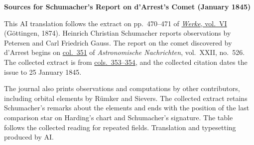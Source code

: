 \clearpage\thispagestyle{empty}
\begin{center}\textbf{Sources for Schumacher’s Report on d’Arrest’s Comet (January 1845)}\end{center}
\noindent This AI translation follows the extract on pp.~470--471 of \href{https://gdz.sub.uni-goettingen.de/id/PPN236007467}{\textit{Werke}, vol.~VI} (Göttingen, 1874). Heinrich Christian Schumacher reports observations by Petersen and Carl Friedrich Gauss. The report on the comet discovered by d’Arrest begins on \href{https://api.digitale-sammlungen.de/iiif/image/v2/bsb10049447_00184/full/1800,/0/default.jpg}{col.~351} of \textit{Astronomische Nachrichten}, vol.~XXII, no.~526. The collected extract is from \href{https://api.digitale-sammlungen.de/iiif/image/v2/bsb10049447_00185/full/1800,/0/default.jpg}{cols.~353--354}, and the collected citation dates the issue to 25 January 1845.
\par\smallskip\noindent The journal also prints observations and computations by other contributors, including orbital elements by Rümker and Sievers. The collected extract retains Schumacher’s remarks about the elements and ends with the position of the last comparison star on Harding’s chart and Schumacher’s signature. The table follows the collected reading for repeated fields. Translation and typesetting produced by AI.
\clearpage
